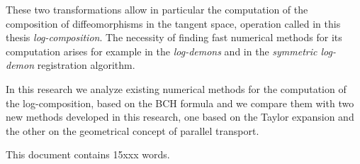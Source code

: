 These two transformations allow in particular the computation of the composition of diffeomorphisms in the tangent space, operation called in this thesis \emph{log-composition}. 
The necessity of finding fast numerical methods for its computation arises for example in the \emph{log-demons} and in the \emph{symmetric log-demon} registration algorithm.

In this research we analyze existing numerical methods for the computation of the log-composition, based on the BCH formula and we compare them with two new methods developed in this research, one based on the Taylor expansion and the other on the geometrical concept of parallel transport. 

\begin{flushright}
This document contains 15xxx words. 
\end{flushright}

 





